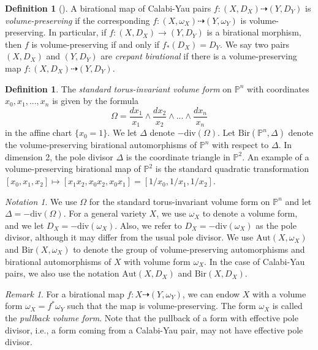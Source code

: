 \documentclass[a4paper,12pt,oneside]{amsart}
\numberwithin{equation}{section}
\theoremstyle{definition}
\newtheorem{definition}[theorem]{Definition}
\theoremstyle{remark}
\newtheorem{remark}[theorem]{Remark}
\newtheorem{notation}[theorem]{Notation}
\newcommand{\Bir}{\mathrm{Bir}}
\newcommand{\Aut}{\mathrm{Aut}}
\begin{document}
\begin{definition}[{\cite[Definition 1.6, Remark 1.7]{corti}}]\label{crep}
A birational map of Calabi-Yau pairs $f: (X, D_X) \dashrightarrow (Y, D_Y)$ is \emph{volume-preserving} if the corresponding $f: (X, \omega_X) \dashrightarrow (Y, \omega_Y)$ is volume-preserving. In particular, if $f\colon (X,D_X)\to (Y,D_Y)$ is a birational morphism, then $f$ is volume-preserving if and only if $f_*(D_X) = D_Y$. We say two pairs $(X, D_X)$ and $(Y, D_Y)$ are \emph{crepant birational} if there is a volume-preserving map $f: (X, D_X) \dashrightarrow (Y, D_Y)$.
\end{definition}


\begin{definition}
The \emph{standard torus-invariant volume form} on $\mathbb{P}^n$ with coordinates $x_0,x_1,...,x_n$ is given by the formula
\[
\Omega = \frac{dx_1}{x_1} \wedge \frac{dx_2}{x_2}\wedge ...\wedge \frac{dx_n}{x_n}
\]
in the affine chart $\{{x_0= 1}\}$. We let $\Delta$ denote $-\mathrm{div}(\Omega)$. 
Let $\mathrm{Bir}(\mathbb{P}^n, \Delta)$ denote the volume-preserving birational automorphisms of $\mathbb{P}^n$ with respect to $\Delta$. In dimension 2, the pole divisor $\Delta$ is the coordinate triangle in $\mathbb{P}^2$. An example of a volume-preserving birational map of $\mathbb{P}^2$ is the standard quadratic transformation $[x_0,x_1,x_2] \mapsto [x_1x_2,x_0x_2,x_0x_1]=[1/x_0,1/x_1,1/x_2]$.
\end{definition}

\begin{notation} We use $\Omega$ for the standard torus-invariant volume form on $\mathbb{P}^n$ and let $\Delta = -\mathrm{div}(\Omega)$. For a general variety $X$, we use $\omega_X$ to denote a volume form, and we let $D_X = -\mathrm{div}(\omega_X)$. Also, we refer to $D_X = -\mathrm{div}(\omega_X)$ as the pole divisor, although it may differ from the usual pole divisor. We use $\Aut(X,\omega_X)$ and $\Bir(X,\omega_X)$ to denote the group of volume-preserving automorphisms and birational automorphisms of $X$ with volume form $\omega_X$. In the case of Calabi-Yau pairs, we also use the notation $\Aut(X,D_X)$ and $\Bir(X,D_X)$.
\end{notation}

\begin{remark}
For a birational map $f: X \dashrightarrow (Y, \omega_Y)$, we can endow $X$ with a volume form $\omega_X = f^*\omega_{Y}$ such that the map is volume-preserving. The form $\omega_X$ is called the \emph{pullback volume form}. Note that the pullback of a form with effective pole divisor, i.e., a form coming from a Calabi-Yau pair, may not have effective pole divisor.
\end{remark}
\end{document}
